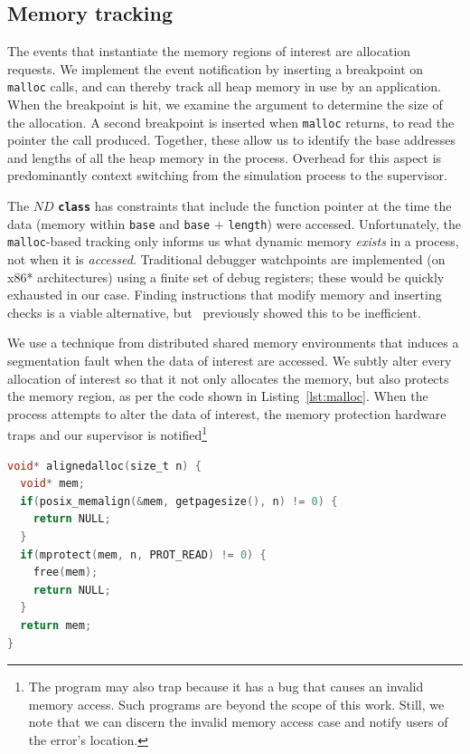 \subsection{Memory tracking}

The events that instantiate the memory regions of interest are
allocation requests.  We implement the event notification by
inserting a breakpoint on \texttt{malloc} calls, and can thereby track
all heap memory in use by an application.  When the breakpoint is hit,
we examine the argument to determine the size of the allocation.  A
second breakpoint is inserted when
\texttt{malloc} returns, to read the pointer the call produced.
Together, these allow us to identify the base addresses and lengths
of all the heap memory in the process.  Overhead for this aspect is
predominantly context switching from the simulation process to the
supervisor.

The $ND$ \texttt{\textbf{class}} has constraints that include the
function pointer at the time the data (memory within \texttt{base} and
\texttt{base} $+$ \texttt{length}) were accessed.  Unfortunately, the
\texttt{malloc}-based tracking only informs us what dynamic memory
\emph{exists} in a process, not when it is \emph{accessed}.
Traditional debugger watchpoints are implemented (on x86*
architectures) using a finite set of debug registers; these would be
quickly exhausted in our case.  Finding instructions that modify memory
and inserting checks is a viable
alternative, but~\cite{Antoniu:2001:PFault} previously showed this to
be inefficient.


We use a technique from distributed shared memory environments that
induces a segmentation fault when the data of interest are accessed.
We subtly alter every allocation of interest so that it not only
allocates the memory, but also protects the memory region, as per the code
shown in Listing~\ref{lst:malloc}.  When the process attempts to alter
the data of interest, the memory
protection hardware traps and our supervisor is notified\footnote{The
program may also trap because it has a bug that causes an invalid
memory access.  Such programs are beyond the scope of this work.
Still, we note that we can discern the invalid memory access case and
notify users of the error's location.}

\begin{lstlisting}[label=lst:malloc,language=C,caption=Replacement \texttt{malloc}
implementation used for tracking field access.]
void* alignedalloc(size_t n) {
  void* mem;
  if(posix_memalign(&mem, getpagesize(), n) != 0) {
    return NULL;
  }
  if(mprotect(mem, n, PROT_READ) != 0) {
    free(mem);
    return NULL;
  }
  return mem;
}
\end{lstlisting}

